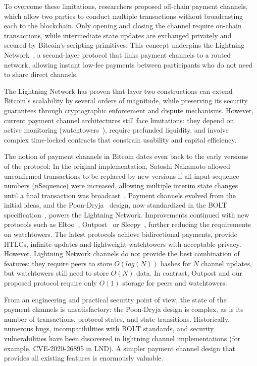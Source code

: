 \documentclass[11pt,a4paper]{article}
\begin{document}
To overcome these limitations, researchers proposed off-chain payment channels, which allow two parties to conduct multiple transactions without broadcasting each to the blockchain. Only opening and closing the channel require on-chain transactions, while intermediate state updates are exchanged privately and secured by Bitcoin’s scripting primitives. This concept underpins the Lightning Network~\cite{poon2016bitcoin}, a second-layer protocol that links payment channels to a routed network, allowing instant low-fee payments between participants who do not need to share direct channels.

The Lightning Network has proven that layer two constructions can extend Bitcoin’s scalability by several orders of magnitude, while preserving its security guarantees through cryptographic enforcement and dispute mechanisms. However, current payment channel architectures still face limitations: they depend on active monitoring (watchtowers~\cite{dryja2016unlinkable,pisa}), require prefunded liquidity, and involve complex time-locked contracts that constrain usability and capital efficiency.

The notion of payment channels in Bitcoin dates even back to the early versions of the protocol: In the original implementation, Satoshi Nakamoto allowed unconfirmed transactions to be replaced by new versions if all input sequence numbers (nSequence) were increased, allowing multiple interim state changes until a final transaction was broadcast~\cite{nakamoto2010_nsequence}.
Payment channels evolved from the initial ideas, and the Poon-Dryja~\cite{poon2016bitcoin} design, now standardized in the BOLT specification~\cite{bolts}, powers the Lightning Network. Improvements continued with new protocols such as Eltoo~\cite{decker2018eltoo},   Outpost~\cite{outpost} or Sleepy~\cite{sleepy}, further reducing the requirements on watchtowers. The latest protocols achieve bidirectional payments, provide HTLCs, infinite-updates and lightweight watchtowers with acceptable privacy. However, Lightning Network channels do not provide the best combination of features: they require peers to store $O(log(N))$ hashes for $N$ channel updates, but watchtowers still need to store $O(N)$ data. In contrast, Outpost and our proposed protocol require only $O(1)$ storage for peers and watchtowers.

From an engineering and practical security point of view, the state of the payment channels is unsatisfactory: the Poon-Dryja design is complex, as is its number of transactions, protocol states, and state transitions. Historically, numerous bugs, incompatibilities with BOLT standards, and security vulnerabilities have been discovered in lightning channel implementations (for example, CVE-2020-26895 in LND). A simpler payment channel design that provides all existing features is enormously valuable. 
\end{document}
